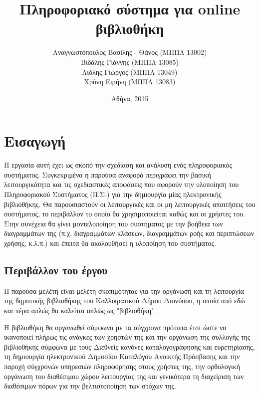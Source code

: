 \documentclass{assignment}
\title{Πληροφοριακό σύστημα για online βιβλιοθήκη}
\date{Αθήνα, 2015}
\author{Αναγνωστόπουλος Βασίλης - Θάνος (ΜΠΠΛ 13002) \\
        Βιδάλης Γιάννης (ΜΠΠΛ 13085) \\
        Λιόλης Γιώργος  (ΜΠΠΛ 13049) \\
        Χρόνη Ειρήνη    (ΜΠΠΛ 13083)  }
\begin{document}
\maketitle

\setcounter{page}{1} 

\pagestyle{plain}
\tableofcontents
\listoftables
\listoffigures
\renewcommand\listoflistingscaption{Κατάλογος πηγαίου κώδικα}
\renewcommand\listingscaption{Πηγαίος κώδικας}
\listoflistings
\newpage

\setcounter{page}{1} 

\section{Εισαγωγή}

Η εργασία αυτή έχει ως σκοπό την σχεδίαση και ανάλυση ενός πληροφοριακός συστήματος. Συγκεκριμένα η παρούσα αναφορά περιγράφει την βασική λειτουργικότητα και τις σχεδιαστικές αποφάσεις που αφορούν την υλοποίηση του Πληροφοριακού Συστήματος (Π.Σ.) για την δημιουργία μίας ηλεκτρονικής βιβλιοθήκης. Θα παρουσιαστούν οι λειτουργικές και οι μη λειτουργικές απαιτήσεις του συστήματος, το περιβάλλον το οποίο θα χρησιμοποιείται καθώς και οι χρήστες του. Στην συνέχεια θα γίνει μοντελοποίηση του συστήματος με την βοήθεια των διαγραμμάτων της  (π.χ. διαγραμμάτων κλάσεων, διαγραμμάτων ροής και περιπτώσεων χρήσης, κ.λ.π.) και έπειτα θα ακολουθήσει η υλοποίηση του συστήματος.

\subsection{Περιβάλλον του έργου}

Η παρούσα μελέτη είναι μελέτη σκοπιμότητας για την οργάνωση και τη λειτουργία της δημοτικής βιβλιοθήκης του Καλλικρατικού Δήμου Διονύσου, η οποία από εδώ και πέρα απλώς θα καλείται απλώς ως "βιβλιοθήκη". 

Η βιβλιοθήκη θα οργανωθεί σύμφωνα με τα σύγχρονα πρότυπα έτσι ώστε να ικανοποιεί πλήρως τις ανάγκες των χρηστών της και την οργάνωση της συλλογής της βιβλιοθήκης σύμφωνα με τους Διεθνείς κανόνες καταλογογράφησης και ευρετηρίασης, τη δημιουργία ηλεκτρονικού Δημοσίου Καταλόγου Ανοικτής Πρόσβασης και την παροχή σύγχρονών υπηρεσιών πληροφόρησης στους χρήστες της, την ορθολογική οργάνωση του διαθέσιμου χώρου λειτουργίας της και γενικότερα τη διαχείριση των διαθέσιμων πόρων για την βελτιστοποίηση των στόχων της.
\end{document}
